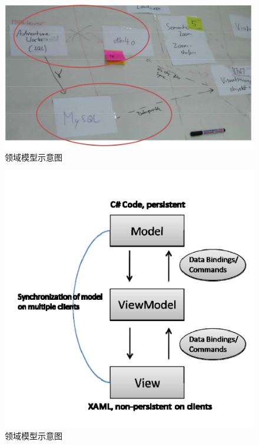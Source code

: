 \begin{figure}[!hbp]
  \begin{center}
    \includegraphics[scale=0.3]{figures/translation/translation_api_fig3.png}
    领域模型示意图
  \end{center}
\end{figure}

\begin{figure}[!hbp]
  \begin{center}
    \includegraphics[scale=0.3]{figures/translation/translation_api_fig4.png}
    领域模型示意图
  \end{center}
\end{figure}

